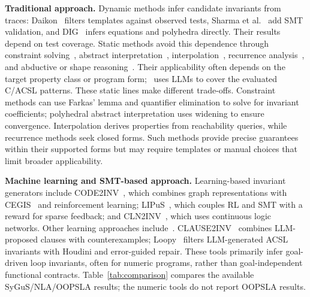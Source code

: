




\smallskip
\noindent\textbf{Traditional approach.}
{Dynamic methods infer candidate invariants from traces: Daikon~\cite{Daikon} filters templates against observed tests, Sharma et al.~\cite{A_Data_Driven_Approach_for_Algebraic_Loop} add SMT validation, and DIG~\cite{dig} infers equations and polyhedra directly. Their results depend on test coverage. Static methods avoid this dependence through constraint solving~\cite{DBLP:journals/pacmpl/LiuFYSL22}, abstract interpretation~\cite{Abstract_Interpretation_A_Unified_Lattice_Model_for_Static_Analysis_of_Programs_by_Construction_or_Approximation_of_Fixpoints,Automatic_Discovery_of_Linear_Restraints_among_Variables_of_a_Program}, interpolation~\cite{DBLP:conf/cade/GanDXZKC16}, recurrence analysis~\cite{DBLP:journals/pacmpl/CyphertK24}, and abductive or shape reasoning~\cite{Inductive_Invariant_Generation_via_Abductive_Inference,SymInfer_Inferring_Numerical_Invariants_using_Symbolic_States}. Their applicability often depends on the target property class or program form; \toolname\ uses LLMs to cover the evaluated C/ACSL patterns.
These static lines make different trade-offs. Constraint methods can use
Farkas' lemma and quantifier elimination to solve for invariant coefficients;
polyhedral abstract interpretation uses widening to ensure convergence.
Interpolation derives properties from reachability queries, while recurrence
methods seek closed forms. %
Such methods provide precise guarantees within their supported forms but may
require templates or manual choices that limit broader applicability.}

\smallskip
\noindent\textbf{Machine learning and SMT-based approach.}
Learning-based invariant generators include CODE2INV~\cite{Code2Inv_a_Deep_Learning_Framework_for_Program_Verification}, which combines graph representations with CEGIS~\cite{Counterexample_Guided_Inductive_Synthesis_Modulo_Theories} and reinforcement learning; LIPuS~\cite{Loop_Invariant_Inference_through_SMT_Solving_Enhanced_Reinforcement_Learning}, which couples RL and SMT with a reward for sparse feedback; and CLN2INV~\cite{Ryan2020CLN2INV}, which uses continuous logic networks. Other learning approaches include~\cite{iRank,Lemur,LLM_Generated_Invariants_for_Bounded_Model_Checking_Without_Loop_Unrolling}. CLAUSE2INV~\cite{DBLP:journals/pacmse/CaoWXYWCM25} combines LLM-proposed clauses with counterexamples; Loopy~\cite{kamath2023findinginductiveloopinvariants} filters LLM-generated ACSL invariants with Houdini and error-guided repair. These tools primarily infer goal-driven loop invariants, often for numeric programs, rather than goal-independent functional contracts. Table~\ref{tab:comparison} compares the available SyGuS/NLA/OOPSLA results; the numeric tools do not report OOPSLA results.

